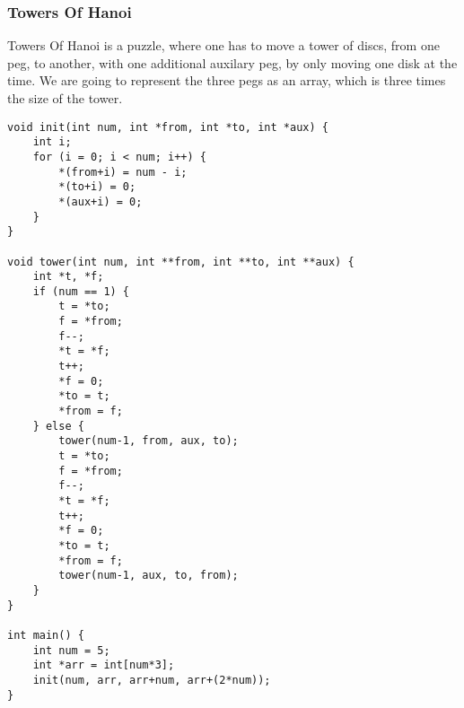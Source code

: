 \subsubsection*{Towers Of Hanoi}
Towers Of Hanoi is a puzzle, where one has to move a tower of discs, from one
peg, to another, with one additional auxilary peg, by only moving one disk at
the time. We are going to represent the three pegs as an array, which is three
times the size of the tower.

\begin{lstlisting}
void init(int num, int *from, int *to, int *aux) {
    int i;
    for (i = 0; i < num; i++) {
        *(from+i) = num - i;
        *(to+i) = 0;
        *(aux+i) = 0;
    }
}

void tower(int num, int **from, int **to, int **aux) {
    int *t, *f;
    if (num == 1) {
        t = *to;
        f = *from;
        f--;
        *t = *f;
        t++;
        *f = 0;
        *to = t;
        *from = f;
    } else {
        tower(num-1, from, aux, to);
        t = *to;
        f = *from;
        f--;
        *t = *f;
        t++;
        *f = 0;
        *to = t;
        *from = f;
        tower(num-1, aux, to, from);
    }
}

int main() {
    int num = 5;
    int *arr = int[num*3];
    init(num, arr, arr+num, arr+(2*num));
}
\end{lstlisting}
